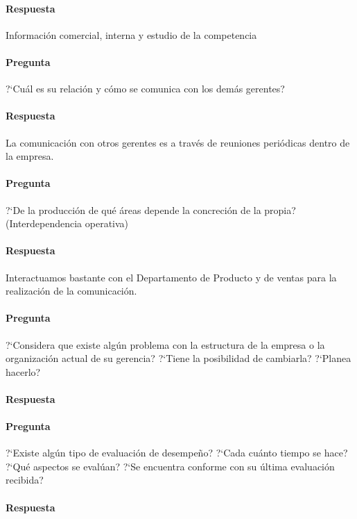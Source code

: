 \documentclass[12pt,a4paper,spanish]{article}
\begin{document}
	\paragraph{Respuesta}
	Informaci\'on comercial, interna y estudio de la competencia


	\paragraph{Pregunta}
	 ?`Cu\'al es su relaci\'on y c\'omo se comunica con los dem\'as gerentes?
	\paragraph{Respuesta}
	La comunicaci\'on con otros gerentes es a trav\'es de reuniones peri\'odicas dentro de la empresa.

	\paragraph{Pregunta}
	 ?`De la producci\'on de qu\'e \'areas depende la concreci\'on de la propia? (Interdependencia operativa)
	\paragraph{Respuesta}
	Interactuamos bastante con el Departamento de Producto y de ventas para la realizaci\'on de la comunicaci\'on.

	\paragraph{Pregunta}
	 ?`Considera que existe alg\'un problema con la estructura de la empresa o la organizaci\'on actual de su gerencia?  ?`Tiene la posibilidad de cambiarla?  ?`Planea hacerlo?
	\paragraph{Respuesta}

	\paragraph{Pregunta}
	 ?`Existe alg\'un tipo de evaluaci\'on de desempe\~{n}o?  ?`Cada cu\'anto tiempo se hace?  ?`Qu\'e aspectos se eval\'uan?  ?`Se encuentra conforme con su \'ultima evaluaci\'on recibida?
	\paragraph{Respuesta}
\end{document}
